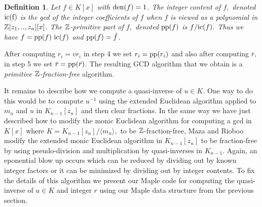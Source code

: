 \documentclass[10pt]{article}
\newtheorem{definition}{Definition}
\begin{document}
\begin{definition}
Let $f \in K[x]$ with ${\rm den}(f) = 1$.
The integer content of $f,$ denoted ${\rm ic(f)}$ is the gcd of the
integer coefficients of $f$ when $f$ is viewed as a polynomial in ${\mathbb Z}[z_1,..,z_n][x]$.
The ${\mathbb Z}$-primitive part of $f,$ denoted ${\rm pp}(f)$ is $f/{\rm ic}(f).$
Thus we have $f = {\rm pp}(f) ~ {\rm ic}(f)$ and ${\rm pp}(f) = \hat f$.
\end{definition}
After computing $r_i = v r_i$ in step 4 we set $r_i = {\rm pp}(r_i)$ and
also after computing $\bar r,$ in step 5 we set $\bar r = {\rm pp}(\bar r)$.
The resulting GCD algorithm that we obtain is a {\em primitive ${\mathbb Z}$-fraction-free}
algorithm.

It remains to describe how we compute a quasi-inverse of $u \in K.$
One way to do this would be to compute $u^{-1}$ using the extended Euclidean algorithm
applied to $m_n$ and $u$ in $K_{n-1}[z_n]$ and then clear fractions.
In the same way we have just described how to modify the monic Euclidean algorithm
for computing a gcd in $K[x]$ where $K = K_{n-1}[z_n]/\langle m_n \rangle,$
to be ${\mathbb Z}$-fraction-free, Maza and Rioboo modify the extended monic Euclidean
algorithm in $K_{n-1}[z_n]$ to be fraction-free by using pseudo-division
and multiplication by quasi-inverses in $K_{n-1}$.
Again, an eponential blow up occurs which can be reduced by dividing out by
known integer factors or it can be minimized by dividing out by integer contents.
To fix the details of this algorithm we present our Maple code for computing
the quasi-inverse of $u \in K$ and integer $r$ using our Maple data structure
from the previous section.
\end{document}
